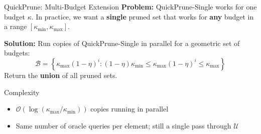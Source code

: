 \documentclass[aspectratio=169,xcolor=dvipsnames,8pt]{beamer}
\begin{document}
\begin{frame}{QuickPrune: Multi-Budget Extension}
  \textbf{Problem:} QuickPrune-Single works for one budget $\kappa$. In practice, we
  want a \textbf{single} pruned set that works for \textbf{any} budget in a range
  $[\kappa_{\min}, \kappa_{\max}]$.

  \vspace{0.3cm}

  \textbf{Solution:} Run copies of QuickPrune-Single in parallel for a geometric set of
  budgets:
  \[
    \mathcal{B} = \left\{\kappa_{\max}(1-\eta)^i : (1-\eta)\kappa_{\min} \leq
    \kappa_{\max}(1-\eta)^i \leq \kappa_{\max}\right\}
  \]
  Return the \textbf{union} of all pruned sets.

  \vspace{0.3cm}

  \begin{block}{Complexity}
    \begin{itemize}
      \item $\mathcal{O}(\log(\kappa_{\max}/\kappa_{\min}))$ copies running in parallel
      \item Same number of oracle queries per element; still a single pass
        through $\mathcal{U}$
    \end{itemize}
  \end{block}
\end{frame}
\end{document}

